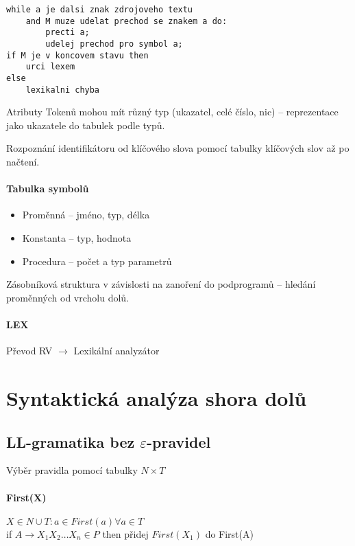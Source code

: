 \documentclass[a4wide]{report}
\begin{document}
\begin{lstlisting}
while a je dalsi znak zdrojoveho textu
	and M muze udelat prechod se znakem a do:
		precti a;
		udelej prechod pro symbol a;
if M je v koncovem stavu then
	urci lexem
else
	lexikalni chyba
\end{lstlisting}

Atributy Tokenů mohou mít různý typ (ukazatel, celé číslo, nic) -- reprezentace jako ukazatele do tabulek podle typů.

Rozpoznání identifikátoru od klíčového slova pomocí tabulky klíčových slov až po načtení.

\paragraph{Tabulka symbolů}

\begin{itemize}
	\item Proměnná -- jméno, typ, délka
	\item Konstanta -- typ, hodnota
	\item Procedura -- počet a typ parametrů
\end{itemize}

Zásobníková struktura v závislosti na zanoření do podprogramů -- hledání proměnných od vrcholu dolů.

\paragraph{LEX} Převod RV $\to$ Lexikální analyzátor


\section{Syntaktická analýza shora dolů}

\subsection{LL-gramatika bez $\varepsilon$-pravidel}
Výběr pravidla pomocí tabulky $N \times T$

\paragraph{First(X)}
$X \in N \cup T: a \in First(a) \forall a \in T$ \\
if $A \to X_1 X_2 \dots X_n \in P$ then přidej $First(X_1)$ do First(A)
\end{document}

